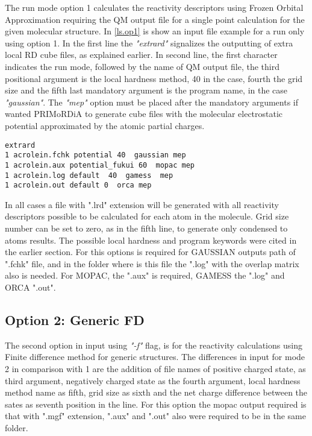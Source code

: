 \documentclass[a4paper,11pt]{refart}
\begin{document}
The run mode option 1 calculates the reactivity descriptors using Frozen Orbital Approximation requiring the QM output file for a single point calculation for the given molecular structure. In \autoref{ls.op1} is show an input file example for a run only using option 1. In the first line the \emph{"extrard"} signalizes the outputting of extra local RD cube files, as explained earlier. In second line, the first character indicates the run mode, followed by the name of QM output file, the third positional argument is the local hardness method, 40 in the case, fourth the grid size and the fifth last mandatory argument is the program name, in the case \emph{"gaussian"}. The \emph{"mep"} option must be placed after the mandatory arguments if wanted PRIMoRDiA to generate cube files with the molecular electrostatic potential approximated by the atomic partial charges. 

\hspace*{-\leftmarginwidth}
\begin{minipage}{\fullwidth}
\begin{lstlisting}[caption=Example of input for reactivity descriptor calculations using Frozen Orbital Approximations.,label={ls.op1}]
extrard 
1 acrolein.fchk potential 40  gaussian mep
1 acrolein.aux potential_fukui 60  mopac mep 
1 acrolein.log default  40  gamess  mep
1 acrolein.out default 0  orca mep
\end{lstlisting}
\end{minipage}

In all cases a file with ".lrd" extension will be generated with all reactivity descriptors possible to be calculated for each atom in the molecule. Grid size number can be set to zero, as in the fifth line, to generate only condensed to atoms results. The possible local hardness and program keywords were cited in the earlier section.  For this options is required for GAUSSIAN outputs path of ".fchk" file, and in the folder where is this file the ".log" with the overlap matrix also is needed. For MOPAC, the ".aux" is required, GAMESS the ".log" and ORCA ".out".  

\subsection{Option 2: Generic FD}

The second option in input using \emph{"-f"} flag, is for the reactivity calculations using Finite difference method for generic structures. The differences in input for mode 2 in comparison with 1 are the addition of file names of positive charged state, as third argument, negatively charged state as the fourth argument, local hardness method name as fifth, grid size as sixth and the net charge difference between the sates as seventh position in the line. For this option the mopac output required is that with ".mgf" extension, ".aux" and ".out" also were required to be in the same folder. 
\end{document}
